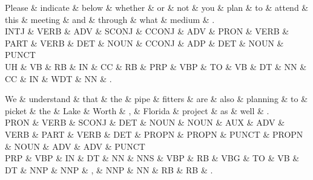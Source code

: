 \begin{dependency}
\begin{deptext}
Please \& indicate \& below \& whether \& or \& not \& you \& plan \& to \& attend \& this \& meeting \& and \& through \& what \& medium \& . \\
INTJ \& VERB \& ADV \& SCONJ \& CCONJ \& ADV \& PRON \& VERB \& PART \& VERB \& DET \& NOUN \& CCONJ \& ADP \& DET \& NOUN \& PUNCT \\
UH \& VB \& RB \& IN \& CC \& RB \& PRP \& VBP \& TO \& VB \& DT \& NN \& CC \& IN \& WDT \& NN \& . \\
\end{deptext}



\end{dependency}

\begin{dependency}
\begin{deptext}
We \& understand \& that \& the \& pipe \& fitters \& are \& also \& planning \& to \& picket \& the \& Lake \& Worth \& , \& Florida \& project \& as \& well \& . \\
PRON \& VERB \& SCONJ \& DET \& NOUN \& NOUN \& AUX \& ADV \& VERB \& PART \& VERB \& DET \& PROPN \& PROPN \& PUNCT \& PROPN \& NOUN \& ADV \& ADV \& PUNCT \\
PRP \& VBP \& IN \& DT \& NN \& NNS \& VBP \& RB \& VBG \& TO \& VB \& DT \& NNP \& NNP \& , \& NNP \& NN \& RB \& RB \& . \\
\end{deptext}



\end{dependency}

